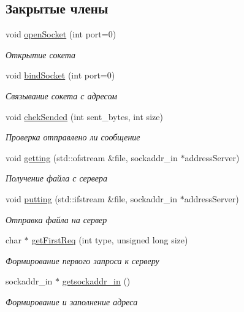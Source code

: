 \subsection*{Закрытые члены}
\begin{DoxyCompactItemize}
\item 
void \mbox{\hyperlink{classclient_a7fc29fda7ffe4db7d5d83505f8be001b}{open\+Socket}} (int port=0)
\begin{DoxyCompactList}\small\item\em Открытие сокета \end{DoxyCompactList}\item 
void \mbox{\hyperlink{classclient_a4bb044f07b5c114bc5ad015a1de6260b}{bind\+Socket}} (int port=0)
\begin{DoxyCompactList}\small\item\em Связывание сокета с адресом \end{DoxyCompactList}\item 
void \mbox{\hyperlink{classclient_a74e23b3ed8459b630822b5838eb5c19c}{chek\+Sended}} (int sent\+\_\+bytes, int size)
\begin{DoxyCompactList}\small\item\em Проверка отправлено ли сообщение \end{DoxyCompactList}\item 
void \mbox{\hyperlink{classclient_a3d5dcc87c7c44d1f334ad39325ce9a08}{getting}} (std\+::ofstream \&file, sockaddr\+\_\+in $\ast$address\+Server)
\begin{DoxyCompactList}\small\item\em Получение файла с сервера \end{DoxyCompactList}\item 
void \mbox{\hyperlink{classclient_a9402ed1d26625f9e65f8d724810511be}{putting}} (std\+::ifstream \&file, sockaddr\+\_\+in $\ast$address\+Server)
\begin{DoxyCompactList}\small\item\em Отправка файла на сервер \end{DoxyCompactList}\item 
char $\ast$ \mbox{\hyperlink{classclient_a01979f2bcb8145f6686fa4d8742d3cce}{get\+First\+Req}} (int type, unsigned long size)
\begin{DoxyCompactList}\small\item\em Формирование первого запроса к серверу \end{DoxyCompactList}\item 
sockaddr\+\_\+in $\ast$ \mbox{\hyperlink{classclient_ac001ccb8499fb06c82c9e6f648e092a0}{getsockaddr\+\_\+in}} ()
\begin{DoxyCompactList}\small\item\em Формирование и заполнение адреса \end{DoxyCompactList}\end{DoxyCompactItemize}
